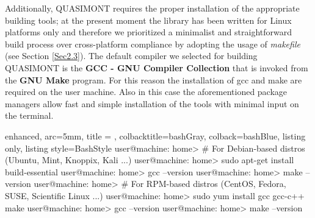 \documentclass[a4paper, twosided]{book}
\begin{document}
\noindent
Additionally, QUASIMONT requires the proper installation of the appropriate building tools; at the present moment the library has been written for Linux platforms only and therefore we prioritized a minimalist and straightforward build process over cross-platform compliance by adopting the usage of {\itshape makefile} (see Section \ref{Sec2.3}). The default compiler we selected for building QUASIMONT is the \color{poliDarkBlue} \textbf{GCC - GNU Compiler Collection} \color{black} \cite{gcc} that is invoked from the \color{poliDarkBlue} \textbf{GNU Make} \color{black} \cite{make} program. For this reason the installation of \colorbox{poliGrayBlue}{gcc} and \colorbox{poliGrayBlue}{make} are required on the user machine. Also in this case the aforementioned package managers allow fast and simple installation of the tools with minimal input on the terminal.

\vspace{0.5cm}
\begin{tcblisting}{enhanced,
                   arc=5mm,
                   title = \color{black}{\large \ttfamily Installation of building tools},
                   colbacktitle=bashGray,
                   colback=bashBlue,
                   listing only,
                   listing style=BashStyle}
user@machine: home> # For Debian-based distros (Ubuntu, Mint, Knoppix, Kali ...)
user@machine: home> sudo apt-get install build-essential
user@machine: home> gcc --version
user@machine: home> make --version
user@machine: home> # For RPM-based distros (CentOS, Fedora, SUSE, Scientific Linux ...)
user@machine: home> sudo yum install gcc gcc-c++ make
user@machine: home> gcc --version
user@machine: home> make --version
\end{tcblisting}
\vspace{0.5cm}
\end{document}
